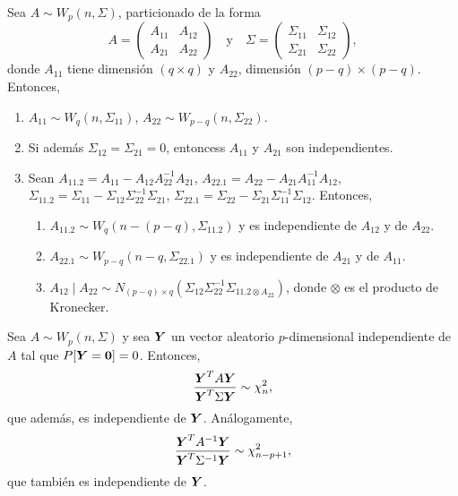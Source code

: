 \begin{nprop}
  Sea \(A \sim W_p(n, \Sigma)\), particionado de la forma
  \[
    A = \begin{pmatrix}
      A_{11} & A_{12} \\ A_{21} & A_{22}
    \end{pmatrix}
    \quad \text{y} \quad
    \Sigma = \begin{pmatrix}
      \Sigma_{11} & \Sigma_{12} \\ \Sigma_{21} & \Sigma_{22}
    \end{pmatrix},
  \]
  donde \(A_{11}\) tiene dimensión \((q \times q)\) y \(A_{22}\), dimensión \((p-q)\times(p-q)\). Entonces,
  \begin{enumerate}
    \item \(A_{11} \sim W_q(n, \Sigma_{11})\), \(A_{22} \sim W_{p-q}(n, \Sigma_{22})\).
    \item Si además \(\Sigma_{12} = \Sigma_{21} = 0\), entoncess \(A_{11}\) y \(A_{21}\) son independientes.
    \item Sean \(A_{11.2} = A_{11} - A_{12}A_{22}^{-1}A_{21}\), \(A_{22.1} = A_{22} - A_{21}A_{11}^{-1}A_{12}\), \(\Sigma_{11.2} = \Sigma_{11} - \Sigma_{12}\Sigma_{22}^{-1}\Sigma_{21}\), \(\Sigma_{22.1} = \Sigma_{22} - \Sigma_{21}\Sigma_{11}^{-1}\Sigma_{12}\). Entonces,
    \begin{enumerate}
      \item \(A_{11.2} \sim W_q(n-(p-q), \Sigma_{11.2})\) y es independiente de \(A_{12}\) y de \(A_{22}\).
      \item \(A_{22.1} \sim W_{p-q}(n-q, \Sigma_{22.1})\) y es independiente de \(A_{21}\) y de \(A_{11}\).
      \item \(A_{12}\mid A_{22} \sim N_{(p-q)\times q}(\Sigma_{12}\Sigma_{22}^{-1}\Sigma_{11.2 \otimes A_{22}})\), donde \(\otimes\) es el producto de Kronecker.
    \end{enumerate}
  \end{enumerate}
\end{nprop}

\begin{nprop}
  Sea \(A \sim W_p(n, \Sigma)\) y sea \(\boldsymbol{Y}\) un vector aleatorio \(p\)-dimensional independiente de \(A\) tal que \(P[\boldsymbol{Y} = \boldsymbol 0] = 0\).
  Entonces,
  \[
    \frac{\boldsymbol{Y}^T A\boldsymbol{Y}}{\boldsymbol{Y}^T\Sigma\boldsymbol{Y}} \sim \chi_n^2,
  \]
  que además, es independiente de \(\boldsymbol{Y}\).
  Análogamente, 
  \[
    \frac{\boldsymbol{Y}^T A^{-1}\boldsymbol{Y}}{\boldsymbol{Y}^T\Sigma^{-1}\boldsymbol{Y}} \sim \chi_{n-p+1}^2,
  \]
  que también es independiente de \(\boldsymbol{Y}\).
\end{nprop}

